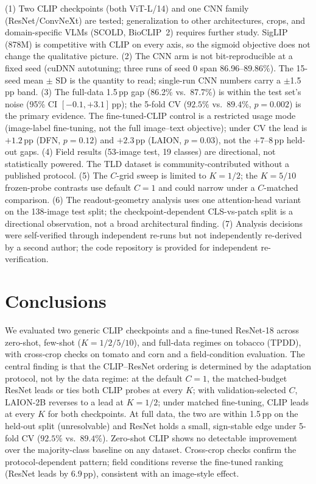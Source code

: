 \documentclass[10pt,a4paper]{article}
\begin{document}
(1) Two CLIP checkpoints (both ViT-L/14) and one CNN family (ResNet/ConvNeXt) are tested; generalization to other architectures, crops, and domain-specific VLMs (SCOLD, BioCLIP~2) requires further study. SigLIP (878M) is competitive with CLIP on every axis, so the sigmoid objective does not change the qualitative picture.
(2) The CNN arm is not bit-reproducible at a fixed seed (cuDNN autotuning; three runs of seed 0 span 86.96--89.86\%). The 15-seed mean $\pm$ SD is the quantity to read; single-run CNN numbers carry a $\pm$1.5\,pp band.
(3) The full-data 1.5\,pp gap (86.2\% vs.\ 87.7\%) is within the test set's noise (95\% CI $[-0.1,+3.1]$\,pp); the 5-fold CV ($92.5\%$ vs.\ $89.4\%$, $p{=}0.002$) is the primary evidence. The fine-tuned-CLIP control is a restricted usage mode (image-label fine-tuning, not the full image--text objective); under CV the lead is $+1.2$\,pp (DFN, $p{=}0.12$) and $+2.3$\,pp (LAION, $p{=}0.03$), not the $+7$--$8$\,pp held-out gaps.
(4) Field results (53-image test, 19 classes) are directional, not statistically powered. The TLD dataset is community-contributed without a published protocol.
(5) The $C$-grid sweep is limited to $K{=}1/2$; the $K{=}5/10$ frozen-probe contrasts use default $C{=}1$ and could narrow under a $C$-matched comparison.
(6) The readout-geometry analysis uses one attention-head variant on the 138-image test split; the checkpoint-dependent CLS-vs-patch split is a directional observation, not a broad architectural finding.
(7) Analysis decisions were self-verified through independent re-runs but not independently re-derived by a second author; the code repository is provided for independent re-verification.


\section{Conclusions}
\label{sec:conclusion}

We evaluated two generic CLIP checkpoints and a fine-tuned ResNet-18 across zero-shot, few-shot ($K{=}1/2/5/10$), and full-data regimes on tobacco (TPDD), with cross-crop checks on tomato and corn and a field-condition evaluation. The central finding is that the CLIP--ResNet ordering is determined by the adaptation protocol, not by the data regime: at the default $C{=}1$, the matched-budget ResNet leads or ties both CLIP probes at every $K$; with validation-selected $C$, LAION-2B reverses to a lead at $K{=}1/2$; under matched fine-tuning, CLIP leads at every $K$ for both checkpoints. At full data, the two are within 1.5\,pp on the held-out split (unresolvable) and ResNet holds a small, sign-stable edge under 5-fold CV ($92.5\%$ vs.\ $89.4\%$). Zero-shot CLIP shows no detectable improvement over the majority-class baseline on any dataset. Cross-crop checks confirm the protocol-dependent pattern; field conditions reverse the fine-tuned ranking (ResNet leads by 6.9\,pp), consistent with an image-style effect.
\end{document}
